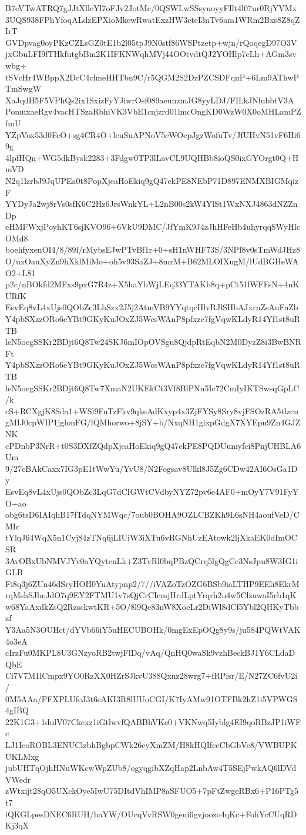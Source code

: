 B7eVTwATRQ7gJJtXllcYl7oFJv2JotMc/0QSWLwSSsyuoyyFIlt4l07ur0RjYVMx
3UQS938FPhYfoqALdzEPXioMkewRwatExzHW3eteI3nTv6am1WRm2Bxs8Z8qZIrT
GVDpvag0oyPKzCZLsGZ0tE1b2l05tpJ9N0stf86WSPtzetp+wjn/rQoqegD97O3V
jxGbuLFI9fTHkfutgbBm2K1IFKNWqhMVj44OOtvdtQJ2YOHlp7cLh+AGm3svwbg+
tSVcHr4WBppX2DcC4clmeHHTbn9C/r5QGM2S2DzPZCSDFqnP+6Lm9AThwPTmSwgW
XaJqdH5F5VPhQs2ix1SxizFyYJiwrOsf089aeunzmJG8yyLDJ/FILkJNlubbtV3A
PomuxaeRgv4vacHTSzaRbhiVK3VbE1cnjzrd01lmcOngKD0WzW0X0oMHLamPZfmU
YZpVox53d0FcO+sg4CR4O+leuSuAPNoV5cWOepJgzWofuTv/JfUHvN51vF6Hi69g
4lpfHQn+WG5dkBysk2283+3Fdgw0TP3lLavCL9UQHBb8ioQS0ixGYOrgt0Q+HmVD
N2q1lzrbJ9JqUPEa0t8PopXjeaHoEkiq9gQ47ekPE8NEbP71D897ENMXBIGMqizF
YYDyJa2wj8rVs0sfK6C2Hz6JrsWnkYL+L2nB00s2kW4YlSt1WxNXJ4863dNZZnDp
eHMFWxjPoyhKT6sjKVO96+6VkU9DMC/JfYmK9J4zJhHFeHb4uhyrqqSWyHlcOMd8
boehfyxenOI4/8/89l/rMybsEJwPTvBf1r+0+sH1nWHF73S/3NPf8v0sTmWdJHz8
O/uxOauXyZn9hXklMiMo+oh5v93SaZJ+8mrM+B62MLOIXugM/lUdBGHeWAO2+L81
p2c/nBOkfd2MFxs9pxG7R4z+X5haYbWjLEq33YTAKb8q+pCt51lWFFsN+4nKURfK
EsvEq8vL4xUjs0QObZc3LhSzx2J5j2AtmVB9YYqtqcHlvRJlSHbAJxrnZsAuFnZb
Y4pbSXzzORo6eYBt9GKyKuJOxZJ5WcsWAnP8pfxzc7fgVqwKLdyR14Yf1st8uRTB
leN5oegSSKr2BDjt6Q8Tw24SKJ6mIOpOVSgu8QjdpRtEqbN2M0DyzZ8i3BwBNRFt
Y4pbSXzzORo6eYBt9GKyKuJOxZJ5WcsWAnP8pfxzc7fgVqwKLdyR14Yf1st8uRTB
leN5oegSSKr2BDjt6Q8Tw7XmaN2UKEkCt3Vf8BlPNn5Ic72CmIyIKTSwsqGpLC/k
cS+RCXgjK8Sda1+WSl9FuTzFkv9qkeAdKxyp4x3ZjFYSy8Sry8vjFSOzRA5tlzcu
gMIJ0cpWIP1jglonFG/lQMhorwo+8jSY+b/NxqNH1gixpGdgX7XYEpu9Zn4GJZNK
cPDnbP3NrR+t0S3DXfZQdpXjeaHoEkiq9gQ47ekPE8PQDUumyfci8PnjUHBLA6Um
9/27cBAkCaxx7IG3pE1tWwYu/YvU8/N2Fogsav8Ulkl8J5Zg6CDw42AI6OsGa1Dy
EsvEq8vL4xUjs0QObZc3LqG7dCIGWtCVdbyNYZ72pv6e4AF0+mOyY7V91FyYO+ao
obg6tsD6IAIqhB17fTdqNYMWqc/7oub0BOHA9OZLCBZKh9L6sNH4aoufVeD/CMIc
tYlqJ64WqX5n1Cyj84zTNq6jLIUiW3iXTu6vRGNhUzEAtowk2ljXkaEK0dImOCSR
3AvOBxUbNMVJYv0aYQytenLk+Z3TvRl0bqPBzQCrq5lgQgCc3NsJpu8W3IG1iGLB
Fi8q3j6ZUn46dSryHOH0YuAtypnp2/7//iVAZoTzOZG6BSb9iaLTHP9EEli8EkrM
rqMshSJbeJdO7q9EY2FTMU1v7sQjCrCIcmjHrdLptYrqrh2u4w5ClzuwaI5rb1qK
w68YaAxdkZsQ2RzsckwtKR+5O/8l9Qe83nW8XoeLr2DiWl8dCf5Ybl2QHKyTbbzf
Y3Aa5N3OUHct/dYVb66iY5uHECUBOHk/0mgExEpOQg8y9s/ju584PQWtVAK4o3eA
cIrzFu0MKPL8U3GNzyoRB2twjFlDq/vAq/QnHQ0waSk9vzhBeckBJ1Y6CLdaDQbE
Ci7V7M1lCmpx9YO0RzXX0HZrSJkvU388Qxnz28wrg7+fRPisr/E/N27ZC6fvU2i/
0M5AAa/PFXPLUfeJ3t6sAKI3R8lUUoCGI/K7IyAMw91OTFBk2hZ1i5VPWGS4gIBQ
22K1G3+1dulV07Ckcxz1iGtlwvfQABBhVKe0+VKNwq5Iyblg4EI9qoRBzJP1iWFc
LJ1IeoROBL3ENUClzbhBgbpCWk26eyXmZM/H8kHQIfccCbGbVc8/VWBUPKUKLMxg
jubUHTqOjhHNuWKcwWpZUb8/ogyqgibXZqHap2LnbAw4T5SEjPwkAQ6lDVdVWedr
zWtxijt28qO5UXckOye5IwU75DItdVhIMP8aSFUO5+7pFtZwgeRBx6+P16PTg5t7
iQKGLpesDNEC6RUH/haYW/OUcqVvRSW0geui6gvjoozo4qKc+FohYcCUqRDKj3qX
